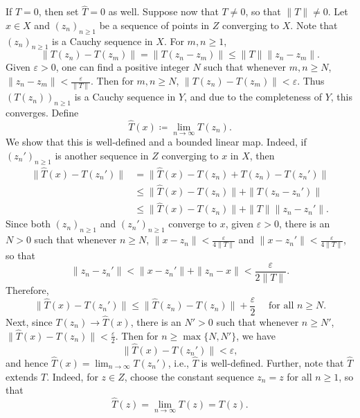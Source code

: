 \documentclass[11pt]{article}
\theoremstyle{thmstyle}
\theoremstyle{defstyle}
\newcommand{\wh}[1]{\widehat{#1}}
\renewcommand{\le}{\leqslant}
\renewcommand{\ge}{\geqslant}
\begin{document}
If $T = 0$, then set $\wh T = 0$ as well. Suppose now that $T\ne 0$, so that $\|T\|\ne 0$. Let $x\in X$ and $(z_n)_{n\ge 1}$ be a sequence of points in $Z$ converging to $X$. Note that $(z_n)_{n\ge 1}$ is a Cauchy sequence in $X$. For $m,n\ge 1$, 
\begin{equation*}
    \|T(z_n) - T(z_m)\| = \|T(z_n - z_m)\|\le\|T\|\|z_n - z_m\|.
\end{equation*}
Given $\varepsilon > 0$, one can find a positive integer $N$ such that whenever $m,n\ge N$, $\|z_n - z_m\| < \frac{\varepsilon}{\|T\|}$. Then for $m,n\ge N$, $\|T(z_n) - T(z_m)\| < \varepsilon$. Thus $\left(T(z_n)\right)_{n\ge 1}$ is a Cauchy sequence in $Y$, and due to the completeness of $Y$, this converges. Define 
\begin{equation*}
    \wh T(x)\coloneq\lim_{n\to\infty} T(z_n).
\end{equation*}
We show that this is well-defined and a bounded linear map. Indeed, if $(z_n')_{n\ge 1}$ is another sequence in $Z$ converging to $x$ in $X$, then 
\begin{align*}
    \|\wh T(x) - T(z_n')\| &= \|\wh T(x) - T(z_n) + T(z_n) - T(z_n')\|\\
    &\le\|\wh T(x) - T(z_n)\| + \|T(z_n - z_n')\|\\
    &\le\|\wh T(x) - T(z_n)\| + \|T\|\|z_n - z_n'\|.
\end{align*}
Since both $(z_n)_{n\ge 1}$ and $(z_n')_{n\ge 1}$ converge to $x$, given $\varepsilon > 0$, there is an $N > 0$ such that whenever $n\ge N$, $\|x - z_n\| < \frac{\varepsilon}{4\|T\|}$ and $\|x - z_n'\| < \frac{\varepsilon}{4\|T\|}$, so that 
\begin{equation*}
    \|z_n - z_n'\| < \|x - z_n'\| + \|z_n - x\| < \frac{\varepsilon}{2\|T\|}.
\end{equation*}
Therefore, 
\begin{equation*}
    \|\wh T(x) - T(z_n')\|\le\|\wh T(z_n) - T(z_n)\| + \frac{\varepsilon}{2}\quad\text{ for all }n\ge N.
\end{equation*}
Next, since $T(z_n)\to\wh T(x)$, there is an $N' > 0$ such that whenever $n\ge N'$, $\|\wh T(x) - T(z_n)\| < \frac{\varepsilon}{2}$. Then for $n\ge\max\{N, N'\}$, we have 
\begin{equation*}
    \|\wh T(x) - T(z_n')\| < \varepsilon,
\end{equation*}
and hence $\wh T(x) = \displaystyle\lim_{n\to\infty} T(z_n')$, i.e., $\wh T$ is well-defined. Further, note that $\wh T$ extends $T$. Indeed, for $z\in Z$, choose the constant sequence $z_n = z$ for all $n\ge 1$, so that 
\begin{equation*}
    \wh T(z) = \lim_{n\to\infty} T(z) = T(z).
\end{equation*}
\end{document}
